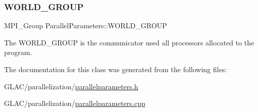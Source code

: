 \subsubsection{\texorpdfstring{WORLD\_GROUP}{WORLD\_GROUP}}
{\footnotesize\ttfamily M\+P\+I\+\_\+\+Group Parallel\+Parameters\+::\+W\+O\+R\+L\+D\+\_\+\+G\+R\+O\+UP\hspace{0.3cm}{\ttfamily [static]}}



The W\+O\+R\+L\+D\+\_\+\+G\+R\+O\+UP is the communicator used all processors allocated to the program. 



The documentation for this class was generated from the following files\+:\begin{DoxyCompactItemize}
\item 
G\+L\+A\+C/parallelization/\mbox{\hyperlink{parallelparameters_8h}{parallelparameters.\+h}}\item 
G\+L\+A\+C/parallelization/\mbox{\hyperlink{parallelparameters_8cpp}{parallelparameters.\+cpp}}\end{DoxyCompactItemize}
